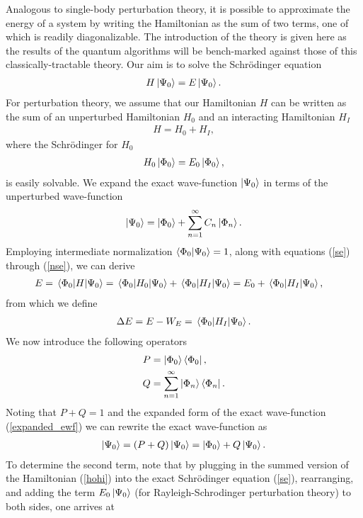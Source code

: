 \documentclass[Dual]{msu-thesis}
\begin{document}
Analogous to single-body perturbation theory, it is possible to approximate the energy of a system by writing the Hamiltonian as the sum of two terms, one of which is readily diagonalizable. The introduction of the theory is given here as the results of the quantum algorithms will be bench-marked against those of this classically-tractable theory. Our aim is to solve the Schr\"{o}dinger equation
\begin{align}
\label{se}
H\ket{\Psi_0}=E\ket{\Psi_0}.
\end{align}
For perturbation theory, we assume that our Hamiltonian $H$ can be written as the sum of an unperturbed Hamiltonian $H_0$ and an interacting Hamiltonian $H_I$
\begin{align}
\label{hohi}
H=H_0+H_I,
\end{align}
where the Schr\"{o}dinger for $H_0$ 
\begin{align}
\label{nse}
H_0\ket{\Phi_0}=E_0\ket{\Phi_0},
\end{align}
is easily solvable.
We expand the exact wave-function $\ket{\Psi_0}$ in terms of the unperturbed wave-function
\begin{align}
\label{expanded_ewf}
\ket{\Psi_0}=\ket{\Phi_0}+\sum_{n=1}^\infty C_n\ket{\Phi_n}.
\end{align}
Employing intermediate normalization $\bra{\Phi_0}\ket{\Psi_0}=1$, along with equations (\ref{se}) through (\ref{nse}), we can derive
\begin{align}
E
&=
\mel{\Phi_0}{H}{\Psi_0}
=
\mel{\Phi_0}{H_0}{\Psi_0}+\mel{\Phi_0}{H_I}{\Psi_0}
=
E_0+\mel{\Phi_0}{H_I}{\Psi_0},
\end{align}
from which we define
\begin{align}
\label{delta_e}
\Delta E = E-W_E = \mel{\Phi_0}{H_I}{\Psi_0}.
\end{align}
We now introduce the following operators
\begin{align}
P
&=
\ket{\Phi_0}\bra{\Phi_0},
\\
Q 
&=
\sum_{n=1}^\infty \ket{\Phi_n}\bra{\Phi_n}.
\end{align}
Noting that $P+Q=1$ and the expanded form of the exact wave-function (\ref{expanded_ewf}) we can rewrite the exact wave-function as
\begin{align}
\label{pq_rw}
\ket{\Psi_0}=(P+Q)\ket{\Psi_0}=\ket{\Phi_0}+Q\ket{\Psi_0}.
\end{align}
To determine the second term, note that by plugging in the summed version of the Hamiltonian (\ref{hohi}) into the exact Schr\"{o}dinger equation (\ref{se}), rearranging, and adding the term $E_0\ket{\Psi_0}$ (for Rayleigh-Schrodinger perturbation theory) to both sides, one arrives at
\end{document}
